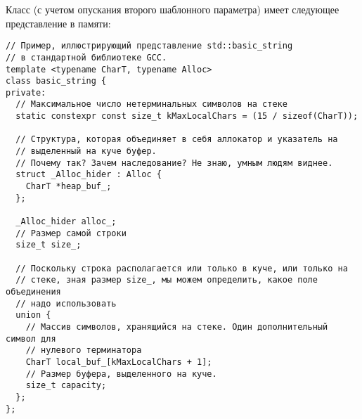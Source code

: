 Класс  (с учетом опускания второго шаблонного параметра) имеет следующее представление в памяти:
\begin{verbatim}
// Пример, иллюстрирующий представление std::basic_string
// в стандартной библиотеке GCC.
template <typename CharT, typename Alloc>
class basic_string {
private:
  // Максимальное число нетерминальных символов на стеке
  static constexpr const size_t kMaxLocalChars = (15 / sizeof(CharT));

  // Структура, которая объединяет в себя аллокатор и указатель на
  // выделенный на куче буфер.
  // Почему так? Зачем наследование? Не знаю, умным людям виднее.
  struct _Alloc_hider : Alloc {
    CharT *heap_buf_;
  };

  _Alloc_hider alloc_;
  // Размер самой строки
  size_t size_;

  // Поскольку строка располагается или только в куче, или только на
  // стеке, зная размер size_, мы можем определить, какое поле объединения
  // надо использовать
  union {
    // Массив символов, хранящийся на стеке. Один дополнительный символ для 
    // нулевого терминатора
    CharT local_buf_[kMaxLocalChars + 1];
    // Размер буфера, выделенного на куче.
    size_t capacity;
  };
};
\end{verbatim}